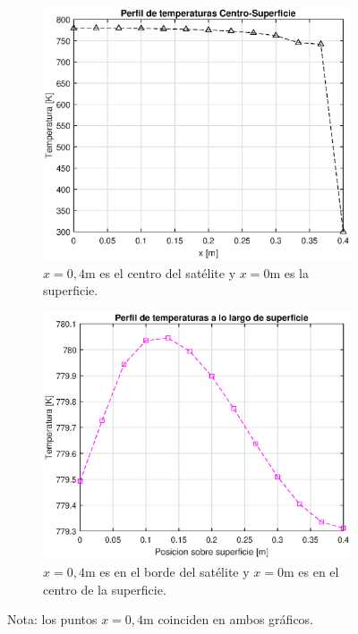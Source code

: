 \documentclass[onecolumn,10pt,titlepage,a4paper]{article}
\begin{document}
\begin{figure}[htb!]
	\centering
	\begin{subfigure}{0.49\textwidth}
		\includegraphics[width=1\textwidth]{fig/perfil11div.eps}
		\caption{$x=0,4$m es el centro del satélite y $x=0$m es la superficie.}
		\label{fig:perfilinterior}
	\end{subfigure}
	\hfill
	\begin{subfigure}{0.49\textwidth}
		\includegraphics[width=\textwidth]{fig/perfilRad11div.eps}
		\caption{$x=0,4$m es en el borde del satélite y $x=0$m es en el centro de la superficie.}
		\label{fig:perfilsuperficie}
	\end{subfigure}
\caption{Nota: los puntos $x=0,4$m coinciden en ambos gráficos.}
\end{figure}


% 
\end{document}
